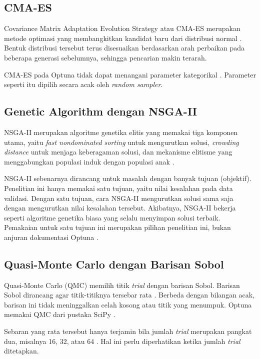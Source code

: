 \subsection{CMA-ES}
Covariance Matrix Adaptation Evolution Strategy atau CMA-ES merupakan metode
optimasi yang membangkitkan kandidat baru dari distribusi normal
\cite{hansen2001}. Bentuk distribusi tersebut terus disesuaikan berdasarkan
arah perbaikan pada beberapa generasi sebelumnya, sehingga pencarian makin
terarah.

CMA-ES pada Optuna tidak dapat menangani parameter kategorikal
\cite{optunadocs}. Parameter seperti itu dipilih secara acak oleh
\textit{random sampler}.

\subsection{Genetic Algorithm dengan NSGA-II}
NSGA-II merupakan algoritme genetika elitis yang memakai tiga komponen utama,
yaitu \textit{fast nondominated sorting} untuk mengurutkan solusi,
\textit{crowding distance} untuk menjaga keberagaman solusi, dan mekanisme
elitisme yang menggabungkan populasi induk dengan populasi anak
\cite{deb2002}.

NSGA-II sebenarnya dirancang untuk masalah dengan banyak tujuan (objektif).
Penelitian ini hanya memakai satu tujuan, yaitu nilai kesalahan pada data
validasi. Dengan satu tujuan, cara NSGA-II mengurutkan solusi sama saja dengan
mengurutkan nilai kesalahan tersebut. Akibatnya, NSGA-II bekerja seperti
algoritme genetika biasa yang selalu menyimpan solusi terbaik. Pemakaian untuk
satu tujuan ini merupakan pilihan penelitian ini, bukan anjuran dokumentasi
Optuna \cite{optunadocs}.

\subsection{Quasi-Monte Carlo dengan Barisan Sobol}
Quasi-Monte Carlo (QMC) memilih titik \textit{trial} dengan barisan Sobol. Barisan
Sobol dirancang agar titik-titiknya tersebar rata \cite{sobol1967}. Berbeda
dengan bilangan acak, barisan ini tidak meninggalkan celah kosong atau titik
yang menumpuk. Optuna memakai QMC dari pustaka SciPy \cite{roy2023qmc}.

Sebaran yang rata tersebut hanya terjamin bila jumlah \textit{trial} merupakan
pangkat dua, misalnya 16, 32, atau 64 \cite{scipysobol}. Hal ini perlu
diperhatikan ketika jumlah \textit{trial} ditetapkan.

